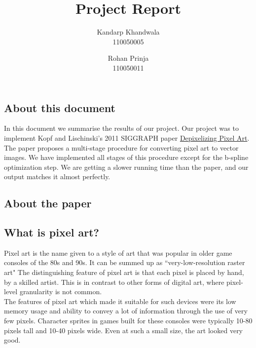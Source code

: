 \documentclass[a4paper,9pt]{article}
\author{
  Kandarp Khandwala\\
  110050005
  \and
  Rohan Prinja\\
  110050011
}
\title{Project Report}
\begin{document}

\maketitle


\textcolor{myrust}{\section{About this document}}

In this document we summarise the results of our project. Our project was to implement Kopf and Lischinski's 2011 SIGGRAPH paper \href{http://research.microsoft.com/en-us/um/people/kopf/pixelart/}{Depixelizing Pixel Art}. The paper proposes a multi-stage procedure for converting pixel art to vector images. We have implemented all stages of this procedure except for the b-spline optimization step. We are getting a slower running time than the paper, and our output matches it almost perfectly.

\textcolor{myrust}{\section{About the paper}}

\textcolor{myrust}{\subsection{What is pixel art?}}

Pixel art is the name given to a style of art that was popular in older game consoles of the 80s and 90s. It can be summed up as ``very-low-resolution raster art" The distinguishing feature of pixel art is that each pixel is placed by hand, by a skilled artist. This is in contrast to other forms of digital art, where pixel-level granularity is not common.\\

The features of pixel art which made it suitable for such devices were its low memory usage and ability to convey a lot of information through the use of very few pixels. Character sprites in games built for these consoles were typically 10-80 pixels tall and 10-40 pixels wide. Even at such a small size, the art looked very good.\\
\end{document}
